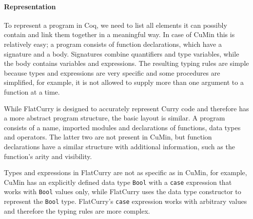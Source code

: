\documentclass[paper = a4, fleqn, abstract=on, twoside]{scrreprt}
\begin{document}
\paragraph{Representation}
To represent a program in Coq, we need to list all elements it can possibly contain and link them together in a meaningful way. In case of CuMin this is relatively easy; a program consists of function declarations, which have a signature and a body. Signatures combine quantifiers and type variables, while the body contains variables and expressions. The resulting typing rules are simple because types and expressions are very specific and some procedures are simplified, for example, it is not allowed to supply more than one argument to a function at a time. 
\par
While FlatCurry is designed to accurately represent Curry code and therefore has a more abstract program structure, the basic layout is similar. A program consists of a name, imported modules and declarations of functions, data types and operators. The latter two are not present in CuMin, but function declarations have a similar structure with additional information, such as the function's arity and visibility.
\par
Types and expressions in FlatCurry are not as specific as in CuMin, for example, CuMin has an explicitly defined data type \texttt{Bool} with a \texttt{case} expression that works with \texttt{Bool} values only, while FlatCurry uses the data type constructor to represent the \texttt{Bool} type. FlatCurry's \texttt{case} expression works with arbitrary values and therefore the typing rules are more complex.\\
\end{document}

